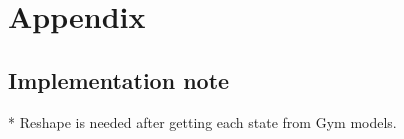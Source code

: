 \documentclass{article}
\begin{document}
    \section*{Appendix}

    \subsection{Implementation note}
    * Reshape is needed after getting each state from Gym models.




    
    





\end{document}
